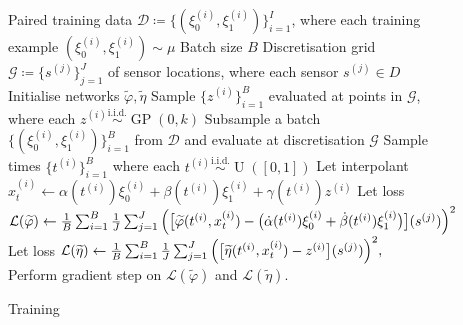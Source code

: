 \begin{figure}
  \begin{singlespace}
    \begin{algorithm}[H]
      \caption{Training}\label{alg:training}
      \begin{algorithmic}[1]%
        \Require Paired training data \(\mathcal{D} \coloneqq \{(\xi_{0}^{(i)}, \xi_{1}^{(i)})\}_{i=1}^{I}\), where each training example \((\xi_{0}^{(i)}, \xi_{1}^{(i)}) \sim \mu\)
        \Require Batch size \(B\)
        \Require Discretisation grid \(\mathcal{G} \coloneqq \{s^{(j)}\}_{j=1}^{J}\) of sensor locations, where each sensor  \(s^{(j)} \in D\)
        \State Initialise networks \(\widetilde{\varphi}, \widetilde{\eta}\)
        \State Sample \(\{z^{(i)}\}_{i=1}^{B}\) evaluated at points in \(\mathcal{G}\), where each \(z^{(i)} \overset{\text{i.i.d.}}{\sim} \operatorname{GP}(0, k)\)
        \State Subsample a batch \(\{(\xi_{0}^{(i)}, \xi_{1}^{(i)})\}_{i=1}^{B}\) from \(\mathcal{D}\) and evaluate at discretisation \(\mathcal{G}\)
        \State Sample times \(\{t^{(i)}\}_{i=1}^{B}\) where each \(t^{(i)} \overset{\text{i.i.d.}}{\sim} \operatorname{U}([0, 1])\)
        \State Let interpolant \(x_{t}^{(i)} \leftarrow \alpha(t^{(i)}) \xi_{0}^{(i)} +\beta(t^{(i)})\xi_{1}^{(i)} + \gamma(t^{(i)}) z^{(i)}\)
        \State Let loss \(\mathcal{L}(\widetilde{\varphi}) \leftarrow \frac{1}{B}\sum_{i=1}^{B}\frac{1}{J} \sum_{j=1}^{J} \qty(\big[\widetilde{\varphi}(t^{(i)}, x^{(i)}_{t}) - \big(\dot{\alpha}(t^{(i)}) \xi_{0}^{(i)} + \dot{\beta}(t^{(i)}) \xi_{1}^{(i)}\big)\big](s^{(j)}))^{2} \)
        \State Let loss \(
          \mathcal{L}(\widetilde{\eta}) \leftarrow \frac{1}{B} \sum_{i=1}^{B} \frac{1}{J}\sum_{j=1}^{J} \qty(\big[\widetilde{\eta}(t^{(i)}, x_{t}^{(i)}) - z^{(i)}\big](s^{(j)}))^{2},
        \)
        \State Perform gradient step on \(\mathcal{L}(\widetilde{\varphi})\) and \(\mathcal{L}(\widetilde{\eta})\).
        \EndWhile
      \end{algorithmic}
    \end{algorithm}


\end{singlespace}
\end{figure}
